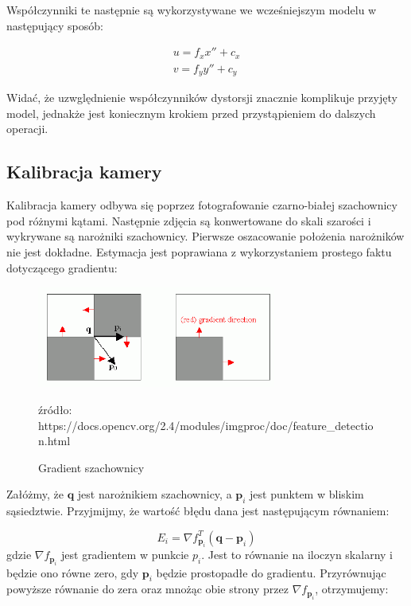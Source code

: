 \documentclass[oneside, eng]{mgr}
\newcommand{\bb}{\textbf}
\begin{document}
Współczynniki te następnie są wykorzystywane we wcześniejszym modelu w następujący sposób:

\begin{gather*}
	u = f_x x'' + c_x \\
	v = f_y y'' + c_y
\end{gather*}

Widać, że uzwględnienie współczynników dystorsji znacznie komplikuje przyjęty model, jednakże jest koniecznym krokiem przed przystąpieniem do dalszych operacji.

\subsection{Kalibracja kamery}

Kalibracja kamery odbywa się poprzez fotografowanie czarno-białej szachownicy pod różnymi kątami. Następnie zdjęcia są konwertowane do skali szarości i wykrywane są narożniki szachownicy. Pierwsze oszacowanie położenia narożników nie jest dokładne. Estymacja jest poprawiana z wykorzystaniem prostego faktu dotyczącego gradientu:

\begin{figure}
\centering
	\includegraphics[width=0.70\textwidth]{img/cornersubpix.png}\par\vspace{1cm}
\caption{Gradient szachownicy}
źródło: https://docs.opencv.org/2.4/modules/imgproc/doc/feature\_detection.html
	\label{fig:gradient}
\end{figure}

Załóżmy, że $\bb{q}$ jest narożnikiem szachownicy, a $\bb{p}_i$ jest punktem w bliskim sąsiedztwie. Przyjmijmy, że wartość błędu dana jest następującym równaniem:

\begin{equation}
	E_i = \nabla f_{\bb{p}_i}^T (\bb{q} - \bb{p}_i)
\end{equation}
gdzie $\nabla f_{\bb{p}_i}$ jest gradientem w punkcie $p_i$. Jest to równanie na iloczyn skalarny i będzie ono równe zero, gdy $\bb{p}_i$ będzie prostopadłe do gradientu. Przyrównując powyższe równanie do zera oraz mnożąc obie strony przez $\nabla f_{\bb{p}_i}$, otrzymujemy:
\end{document}
